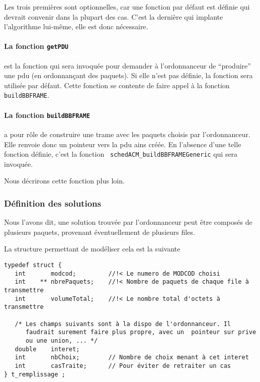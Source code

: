 \documentclass{article}
\begin{document}
   Les trois premières sont optionnelles, car une fonction par défaut
est définie qui devrait convenir dans la plupart des cas. C'est la
dernière qui implante l'algorithme lui-même, elle est donc nécessaire.

\paragraph{La fonction {\tt getPDU}}  est la fonction qui sera invoquée pour
demander à l'ordonnanceur de ``produire'' une {\sc pdu} (en
ordonnançant des paquets). Si elle n'est pas définie, la fonction
 sera
utilisée par défaut. Cette fonction se contente de faire appel à la
fonction {\tt buildBBFRAME}.

\paragraph{La fonction {\tt buildBBFRAME}} a pour rôle de construire
une trame avec les paquets choisis par l'ordonnanceur. Elle renvoie
donc un pointeur vers la {\sc pdu} ains créée. En l'absence d'une
telle fonction définie, c'est la fonction
 {\tt
  schedACM\_buildBBFRAMEGeneric} qui sera invoquée.

   Nous décrirons cette fonction plus loin.

%
\subsubsection{Définition des solutions}

   Nous l'avons dit, une solution trouvée par l'ordonnanceur peut être
composés de plusieurs paquets, provenant éventuellement de
plusieurs files.

   La structure permettant de modéliser cela est la suivante

\begin{verbatim}
typedef struct {
   int       modcod;         //!< Le numero de MODCOD choisi
   int    ** nbrePaquets;    //!< Nombre de paquets de chaque file à transmettre
   int       volumeTotal;    //!< Le nombre total d'octets à transmettre

   /* Les champs suivants sont à la dispo de l'ordonnanceur. Il
      faudrait surement faire plus propre, avec un  pointeur sur prive
      ou une union, ... */
   double    interet;
   int       nbChoix;        // Nombre de choix menant à cet interet
   int       casTraite;      // Pour éviter de retraiter un cas
} t_remplissage ;
\end{verbatim}
\end{document}

